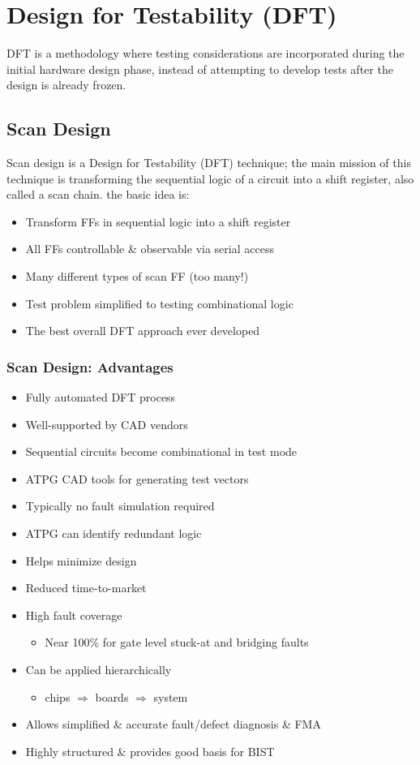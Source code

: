\documentclass[12pt, a4paper]{article}
\begin{document}
\newpage
\section{Design for Testability (DFT)}
DFT is a methodology where testing considerations are incorporated during the initial hardware design phase, instead of attempting to develop tests after the design is already frozen.

\subsection{Scan Design}
Scan design is a Design for Testability (DFT) technique; the main mission of this technique is transforming the sequential logic of a circuit into a shift register, also called a scan chain. the basic idea is:

\begin{itemize}
  \item Transform FFs in sequential logic into a shift register
  \item All FFs controllable \& observable via serial access
  \item Many different types of scan FF (too many!)
  \item Test problem simplified to testing combinational logic
  \item The best overall DFT approach ever developed
\end{itemize}

\subsubsection*{Scan Design: Advantages}
\begin{itemize}
    \item Fully automated DFT process
    \item Well-supported by CAD vendors
    \item Sequential circuits become combinational in test mode
    \item ATPG CAD tools for generating test vectors
    \item Typically no fault simulation required
    \item ATPG can identify redundant logic
    \item Helps minimize design
    \item Reduced time-to-market
    \item High fault coverage
    \begin{itemize}
        \item Near 100\% for gate level stuck-at and bridging faults
    \end{itemize}
    \item Can be applied hierarchically
    \begin{itemize}
        \item chips $\Rightarrow$ boards $\Rightarrow$ system
    \end{itemize}
    \item Allows simplified \& accurate fault/defect diagnosis \& FMA
    \item Highly structured \& provides good basis for BIST
\end{itemize}
\end{document}
